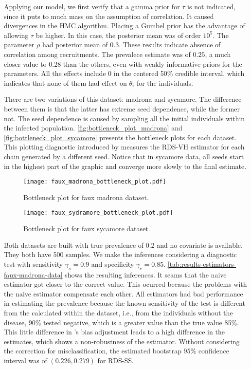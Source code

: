Applying our model, we first verify that a gamma prior for $\tau$ is not
indicated, since it puts to much mass on the assumption of correlation. It
caused divergences in the HMC algorithm. Placing a Gumbel prior has the
advantage of allowing $\tau$ be higher. In this case, the posterior mean was
of order $10^{5}$. The parameter $\rho$ had posterior mean of $0.3$. These
results indicate absence of correlation among recruitments. The prevalece
estimate was of $0.25$, a much closer value to $0.28$ than the others, even
with weakly informative priors for the parameters. All the effects include 0
in the centered 50\% credible interval, which indicates that none of them
had effect on $\theta_i$ for the individuals.

There are two variations of this dataset: madrona and sycamore. The difference
between them is that the latter has extreme seed dependence, while the former
not. The seed dependence is caused by sampling all the initial individuals
within the infected population. \autoref{fig:bottleneck_plot_madrona} and
\autoref{fig:bottleneck_plot_sycamore} presents the bottleneck plots for each
dataset. This plotting diagnostic introduced by \textcite{gile2015diagnostics}
measures the RDS-VH estimator for each chain generated by a different seed.
Notice that in sycamore data, all seeds start in the highest part of the graphic
and converge more slowly to the final estimate. 

\begin{figure}
    \centering
    \caption{\label{fig:bottleneck_plot_madrona}Bottleneck plot for faux
    madrona dataset.}
    \texttt{[image: faux\_madrona\_bottleneck\_plot.pdf]}
\end{figure}

\begin{figure}
    \centering
    \caption{\label{fig:bottleneck_plot_sycamore}Bottleneck plot for faux
    sycamore dataset.}
    \texttt{[image: faux\_sydramore\_bottleneck\_plot.pdf]}
\end{figure}

Both datasets are built with true prevalence of 0.2 and no covariate is
available. They both have 500 samples. We make the
inferences considering a diagnostic test with sensitivity $\gamma_s = 0.9$ 
and specificity $\gamma_e = 0.85$.
\autoref{tab:results-estimators-faux-madrona-data} shows the resulting
inferences. It seams that the naive estimator got closer to the correct value.
This ocurred because the problems with the naive estimator compensate each
other. All estimators had bad performance in estimating the prevalence
because the known sensitivity of the test is different from the calculated
within the dataset, i.e., from the individuals without the disease, 90\%
tested negative, which is a greater value than the true value 85\%. This little difference in
\textcite{rogan1978estimating}'s bias adjustment leads to a high difference in
the estimates, which shows a non-robustness of the estimator. Without considering the
correction for misclassification, the estimated bootstrap 95\% confidence interval was
of $(0.226, 0.279)$ for RDS-SS. 

